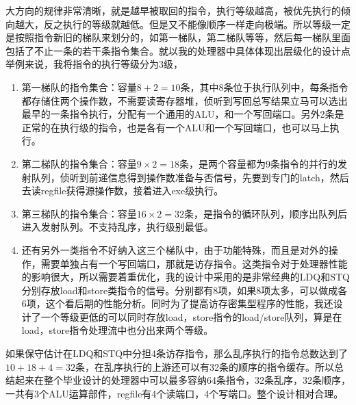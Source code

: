 \documentclass[11pt]{article}
\begin{document}
大方向的规律非常清晰，就是越早被取回的指令，执行等级越高，被优先执行的倾向越大，反之执行的等级就越低。但是又不能像顺序一样走向极端。所以等级一定是按照指令新旧的梯队来划分的，如第一梯队，第二梯队等等，然后每一梯队里面包括了不止一条的若干条指令集合。就以我的处理器中具体体现出层级化的设计点举例来说，我将指令的执行等级分为3级，
\begin{enumerate}
	\item 第一梯队的指令集合：容量$8+2=10$条，其中8条位于执行队列中，每条指令都存储住两个操作数，不需要读寄存器堆，侦听到写回总写结果立马可以选出最早的一条指令执行，分配有一个通用的ALU，和一个写回端口。另外2条是正常的在执行级的指令，也是各有一个ALU和一个写回端口，也可以马上执行。
	\item 第二梯队的指令集合：容量$ 9\times2=18$条，是两个容量都为9条指令的并行的发射队列，侦听到前递信息得到操作数准备与否信号，先要到专门的latch，然后去读regfile获得源操作数，接着进入exe级执行。
	\item 第三梯队的指令集合：容量$ 16\times2=32$条，是指令的循环队列，顺序出队列后进入发射队列。不支持乱序，执行级别最低。
	\item 还有另外一类指令不好纳入这三个梯队中，由于功能特殊，而且是对外的操作，需要单独占有一个写回端口，那就是访存指令。这类指令对于处理器性能的影响很大，所以需要着重优化，我的设计中采用的是非常经典的LDQ和STQ分别存放load和store类指令的信号。分别都有8项，如果8项太多，可以做成各6项，这个看后期的性能分析。同时为了提高访存密集型程序的性能，我还设计了一个等级更低的可以同时存放load，store指令的load/store队列，算是在load，store指令处理流中也分出来两个等级。
\end{enumerate}
如果保守估计在LDQ和STQ中分担4条访存指令，那么乱序执行的指令总数达到了$ 10+18+4 = 32 $条，在乱序执行的上游还可以有32条的顺序的指令缓存。所以总结起来在整个毕业设计的处理器中可以最多容纳64条指令，32条乱序，32条顺序，一共有3个ALU运算部件，regfile有4个读端口，4个写端口。整个设计相对合理。
\end{document}
